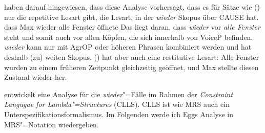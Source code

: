 \citet{JB2003a-u} haben darauf hingewiesen, dass diese Analyse vorhersagt, dass es für Sätze wie
() nur die repetitive Lesart gibt, \dash die Lesart, in der \emph{wieder} Skopus über CAUSE hat.
\ea
\label{ex-wieder-alle}
dass Max wieder alle Fenster öffnete
\z
Das liegt daran, dass \emph{wieder} vor \emph{alle Fenster} steht und somit auch vor allen Köpfen,
die sich innerhalb von VoiceP befinden. \emph{wieder} kann nur mit AgrOP oder höheren Phrasen
kombiniert werden und hat deshalb (zu) weiten Skopus. () hat aber auch eine restitutive
Lesart: Alle Fenster wurden zu einem früheren Zeitpunkt gleichzeitig geöffnet, und Max stellte
diesen Zustand wieder her.


\citet{Egg99a} entwickelt eine Analyse für die \emph{wieder}"=Fälle im Rahmen der \emph{Constraint
  Langugae for Lambda"=Structures} (CLLS). CLLS ist wie MRS auch ein
  Unterspezifikationsformalismus. Im Folgenden werde ich Eggs Analyse in MRS"=Notation
  wiedergeben.

